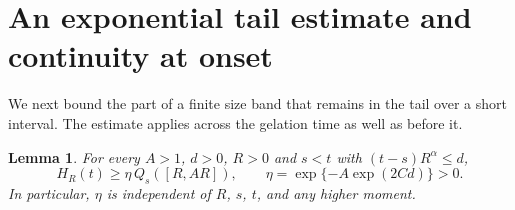 \documentclass[11pt]{article}
\newtheorem{lemma}[theorem]{Lemma}
\begin{document}
\section{An exponential tail estimate and continuity at onset}\label{sec:retention}

We next bound the part of a finite size band that remains in the tail over a short interval. The estimate applies across the gelation time as well as before it.

\begin{lemma}\label{lem:retention}
For every $A>1$, $d>0$, $R>0$ and $s<t$ with $(t-s)R^\alpha\le d$,
\begin{equation}\label{eq:retention}
 H_R(t)\ge\eta\,Q_s([R,AR]),\qquad
 \eta=\exp\{-A\exp(2Cd)\}>0.
\end{equation}
In particular, $\eta$ is independent of $R$, $s$, $t$, and any higher moment.
\end{lemma}
\end{document}
